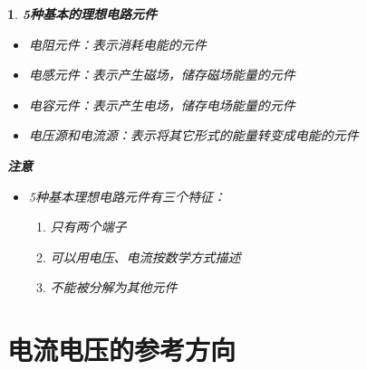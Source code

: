 \documentclass[UTF8]{report}
\theoremstyle{MyLineTheoremStyle} %
\theoremstyle{MyBlockTheoremStyle} %
\theoremstyle{MySubsubsectionStyle} %
\newtheorem{definition}{}
\begin{document}
\begin{definition}
    \textbf{5种基本的理想电路元件}
    \begin{itemize}
        \item 电阻元件：表示消耗电能的元件
        \item 电感元件：表示产生磁场，储存磁场能量的元件
        \item 电容元件：表示产生电场，储存电场能量的元件
        \item 电压源和电流源：表示将其它形式的能量转变成电能的元件
    \end{itemize}
    \textbf{注意}
    \begin{itemize}
        \item 5种基本理想电路元件有三个特征：
        \begin{enumerate}[label=(\alph*)]
            \item 只有两个端子
            \item 可以用电压、电流按数学方式描述
            \item 不能被分解为其他元件
        \end{enumerate}
    \end{itemize}
\end{definition}

\section{电流电压的参考方向}
\end{document}
